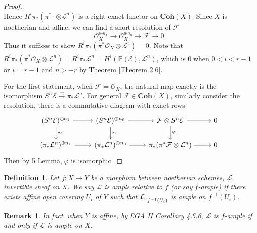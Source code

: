 \documentclass{ctexart}
\newtheorem{definition}{Definition}[section]
\newtheorem{remark}{Remark}[section]
\newcommand{\coherent}{\mathbf{Coh}}
\begin{document}
\begin{proof}
\begin{equation}
    \end{equation}
    Hence $R^{i}\pi_{\ast}(\pi^{\ast}\cdot \otimes \mathcal{L}^{n})$ is a right exact functor on $\coherent (X)$.
    Since $X$ is noetherian and affine, we can find a short resolution of $\mathcal{F}$
    \begin{equation}
        \mathcal{O}_{X}^{\oplus n_{1}} \longrightarrow \mathcal{O}_{X}^{\oplus n_{0}} \longrightarrow \mathcal{F} \longrightarrow 0
    \end{equation}
    Thus it suffices to show $R^{i}\pi_{\ast}(\pi^{\ast}\mathcal{O}_{X} \otimes \mathcal{L}^{n}) = 0$.
    Note that $R^{i}\pi_{\ast}(\pi^{\ast}\mathcal{O}_{X} \otimes \mathcal{L}^{n}) = R^{i}\pi_{\ast}\mathcal{L}^{n} = \widetilde{H^{i}(\mathbb{P}(\mathcal{E}), \mathcal{L}^{n})}$,
    which is $0$ when $0 < i < r - 1$ or $i = r - 1$ and $n > - r$ by Theorem \ref{Theorem 2.6}.
    \par
    For the first statement, when $\mathcal{F} = \mathcal{O}_{X}$, 
    the natural map exactly is the isomorphism $S^{n}\mathcal{E} \overset{\sim}{\rightarrow} \pi_{\ast}\mathcal{L}^{n}$.
    For general $\mathcal{F}\in \coherent (X)$, similarly consider the resolution, there is a commutative diagram with exact rows
    \begin{equation}
        \begin{tikzcd}
            (S^{n}\mathcal{E})^{\oplus n_{1}} \arrow[r] \arrow[d, "\sim"] &
            (S^{n}\mathcal{E})^{\oplus n_{0}} \arrow[r] \arrow[d, "\sim"] &
            \mathcal{F} \otimes S^{n}\mathcal{E} \arrow[r] \arrow[d, "\varphi"] &
            0 \\
            (\pi_{\ast}\mathcal{L}^{n})^{\oplus n_{1}} \arrow[r] &
            (\pi_{\ast}\mathcal{L}^{n})^{\oplus n_{0}} \arrow[r] &
            \pi_{\ast}(\pi^{\ast}\mathcal{F} \otimes \mathcal{L}^{n}) \arrow[r] &
            0
        \end{tikzcd}
    \end{equation}
    Then by 5 Lemma, $\varphi$ is isomorphic.
\end{proof}
\begin{definition}
    Let $f: X \rightarrow Y$ be a morphism between noetherian schemes, $\mathcal{L}$ invertible sheaf on $X$.
    We say $\mathcal{L}$ is ample relative to $f$ (or say $f$-ample) if there exists affine open covering $U_{i}$ of $Y$ such that $\mathcal{L}\big{|}_{f^{-1}(U_{i})}$ is ample on $f^{-1}(U_{i})$.
\end{definition}
\begin{remark}
    In fact, when $Y$ is affine, by EGA II Corollary 4.6.6, $\mathcal{L}$ is $f$-ample if and only if $\mathcal{L}$ is ample on $X$.
\end{remark}
\end{document}
